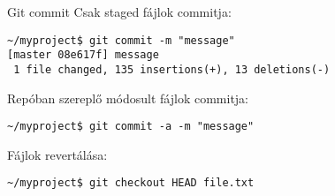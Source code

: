 
\begin{frame}[fragile]{Git commit}
    \pause
    Csak staged fájlok commitja:
\small\begin{verbatim}
~/myproject$ git commit -m "message"
[master 08e617f] message
 1 file changed, 135 insertions(+), 13 deletions(-)
\end{verbatim}\normalsize
    \pause
    
    Repóban szereplő módosult fájlok commitja:
\small\begin{verbatim}
~/myproject$ git commit -a -m "message"
\end{verbatim}\normalsize
    \pause

    Fájlok revertálása:
\small\begin{verbatim}
~/myproject$ git checkout HEAD file.txt
\end{verbatim}\normalsize
\end{frame}

